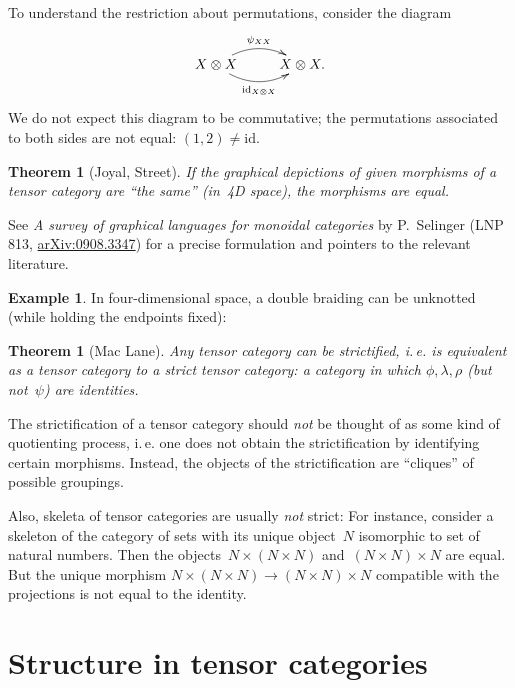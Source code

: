 \documentclass[a4paper,english,12pt]{scrartcl}
\theoremstyle{definition}
\newtheorem{ex}[defn]{Example}
\theoremstyle{plain}
\newtheorem{thm}[defn]{Theorem}
\theoremstyle{remark}
\newcommand{\id}{\mathrm{id}}
\renewcommand{\_}{\mathpunct{.}\,}
\newcommand{\?}{\,{:}\,}
\begin{document}
To understand the restriction about permutations, consider the diagram
\[ \xymatrix{
  X \otimes X \ar@/^1pc/[r]^{\psi_{XX}} \ar@/_1pc/[r]_{\id_{X \otimes X}} & X \otimes X.
} \]
We do not expect this diagram to be commutative; the permutations associated to
both sides are not equal: $(1,2) \neq \id$.

\begin{thm}[Joyal, Street]If the graphical depictions of given morphisms of a
tensor category are ``the same'' (in~4D space), the morphisms are
equal.\end{thm}
See \emph{A survey of graphical languages for monoidal categories}
by P.~Selinger (LNP 813, \href{http://arxiv.org/abs/0908.3347}{arXiv:0908.3347})
for a precise formulation and pointers to the relevant literature.

\begin{ex}In four-dimensional space, a double braiding can be unknotted (while
holding the endpoints fixed):
\begin{center}\scalebox{0.5}{}\end{center}\end{ex}

\begin{thm}[Mac Lane]Any tensor category can be \emph{strictified}, i.\,e. is
equivalent as a tensor category to a \emph{strict} tensor category: a category
in which $\phi, \lambda, \rho$ (but not~$\psi$) are identities.\end{thm}

The strictification of a tensor category should \emph{not} be
thought of as some kind of quotienting process, i.\,e. one does not obtain the
strictification by identifying certain morphisms. Instead, the objects of the
strictification are ``cliques'' of possible groupings.

Also, skeleta of tensor categories are usually \emph{not} strict: For instance,
consider a skeleton of the category of sets with its unique object~$N$
isomorphic to set of natural numbers. Then the objects~$N \times (N \times N)$
and~$(N \times N) \times N$ are equal. But the unique morphism $N \times (N \times
N) \to (N \times N) \times N$ compatible with the projections is not equal to
the identity.


\section{Structure in tensor categories}
\end{document}

